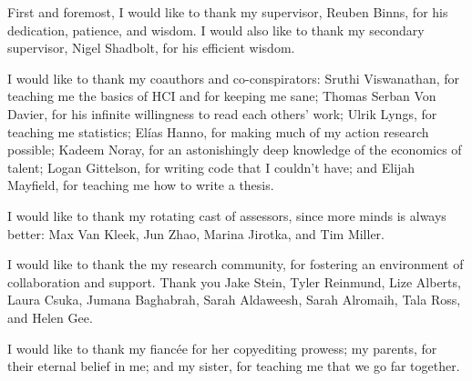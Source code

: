First and foremost, I would like to thank my supervisor, Reuben Binns, for his dedication, patience, and wisdom. I would also like to thank my secondary supervisor, Nigel Shadbolt, for his efficient wisdom.

I would like to thank my coauthors and co-conspirators: Sruthi Viswanathan, for teaching me the basics of HCI and for keeping me sane; Thomas Serban Von Davier, for his infinite willingness to read each others' work; Ulrik Lyngs, for teaching me statistics; Elías Hanno, for making much of my action research possible; Kadeem Noray, for an astonishingly deep knowledge of the economics of talent; Logan Gittelson, for writing code that I couldn't have; and Elijah Mayfield, for teaching me how to write a thesis.

I would like to thank my rotating cast of assessors, since more minds is always better: Max Van Kleek, Jun Zhao, Marina Jirotka, and Tim Miller.

I would like to thank the my research community, for fostering an environment of collaboration and support. Thank you Jake Stein, Tyler Reinmund, Lize Alberts, Laura Csuka, Jumana Baghabrah, Sarah Aldaweesh, Sarah Alromaih, Tala Ross, and Helen Gee.

I would like to thank my fiancée for her copyediting prowess; my parents, for their eternal belief in me; and my sister, for teaching me that we go far together.